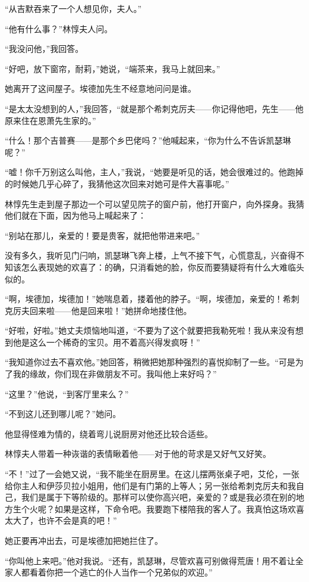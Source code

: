 \par “从吉默吞来了一个人想见你，夫人。”
\par “他有什么事？”林惇夫人问。
\par “我没问他，”我回答。
\par “好吧，放下窗帘，耐莉，”她说，“端茶来，我马上就回来。”
\par 她离开了这间屋子。埃德加先生不经意地问问是谁。
\par “是太太没想到的人，”我回答，“就是那个希刺克厉夫——你记得他吧，先生——他原来住在恩萧先生家的。”
\par “什么！那个吉普赛——是那个乡巴佬吗？”他喊起来，“你为什么不告诉凯瑟琳呢？”
\par “嘘！你千万别这么叫他，主人，”我说，“她要是听见的话，她会很难过的。他跑掉的时候她几乎心碎了，我猜他这次回来对她可是件大喜事呢。”
\par 林惇先生走到屋子那边一个可以望见院子的窗户前，他打开窗户，向外探身。我猜他们就在下面，因为他马上喊起来了：
\par “别站在那儿，亲爱的！要是贵客，就把他带进来吧。”
\par 没有多久，我听见门闩响，凯瑟琳飞奔上楼，上气不接下气，心慌意乱，兴奋得不知该怎么表现她的欢喜了：的确，只消看她的脸，你反而要猜疑将有什么大难临头似的。
\par “啊，埃德加，埃德加！”她喘息着，搂着他的脖子。“啊，埃德加，亲爱的！希刺克厉夫回来啦——他是回来啦！”她拼命地搂住他。
\par “好啦，好啦。”她丈夫烦恼地叫道，“不要为了这个就要把我勒死啦！我从来没有想到他是这么一个稀奇的宝贝。用不着高兴得发疯呀！”
\par “我知道你过去不喜欢他。”她回答，稍微把她那种强烈的喜悦抑制了一些。“可是为了我的缘故，你们现在非做朋友不可。我叫他上来好吗？”
\par “这里？”他说，“到客厅里来么？”
\par “不到这儿还到哪儿呢？”她问。
\par 他显得怪难为情的，绕着弯儿说厨房对他还比较合适些。
\par 林惇夫人带着一种诙谐的表情瞅着他——对于他的苛求是又好气又好笑。
\par “不！”过了一会她又说，“我不能坐在厨房里。在这儿摆两张桌子吧，艾伦，一张给你主人和伊莎贝拉小姐用，他们是有门第的上等人；另一张给希刺克厉夫和我自己，我们是属于下等阶级的。那样可以使你高兴吧，亲爱的？或是我必须在别的地方生个火呢？如果是这样，下命令吧。我要跑下楼陪我的客人了。我真怕这场欢喜太大了，也许不会是真的吧！”
\par 她正要再冲出去，可是埃德加把她拦住了。
\par “你叫他上来吧。”他对我说。“还有，凯瑟琳，尽管欢喜可别做得荒唐！用不着让全家人都看着你把一个逃亡的仆人当作一个兄弟似的欢迎。”
